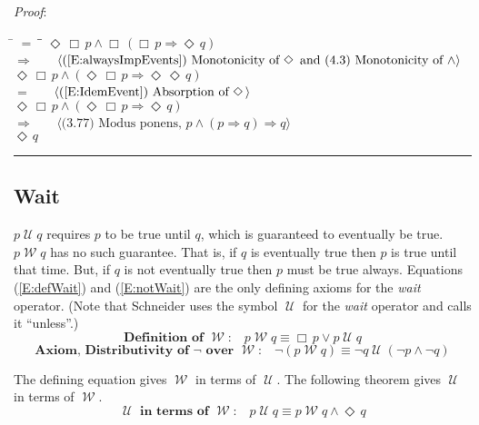 \documentclass[12pt, fleqn, leqno]{article}
\newcommand{\lgap}{2pt}                             %
\newcommand{\mymathindent}{24pt}                    %
\newcommand{\impl}{\ensuremath{\Rightarrow}}        %
\newcommand{\Until}{\;\mathcal{U}\;}
\newcommand{\Wait}{\;\mathcal{W}\;}
\newcommand{\Event}{\Diamond\,}
\newcommand{\Always}{\Box\,}
\newcommand{\myqed}{\rule[-.23ex]{1.2ex}{2.0ex}}
\newcommand{\myqedtab}{\hspace{384pt}}              %
\newcommand{\Gll} {\langle}                         %
\newcommand{\Ggg} {\rangle}                         %
\newcommand{\Hint}[1]     {\ \ \ $\Gll              \mbox{#1} \Ggg$ }   %
\begin{document}
\emph{Proof}:
\begin{tabbing}
\hspace{\mymathindent} \= $= \;$ \= \myqedtab \= \kill
\> \>   $\Event\Always p \land \Always(\Always p \impl \Event q)$\\[\lgap]
\> $\impl$  \>  \Hint{(\ref{E:alwaysImpEvents}) Monotonicity of $\Event$ and (4.3) Monotonicity of $\land$}\\[\lgap]
\> \>   $\Event\Always p \land (\Event\Always p \impl \Event\Event q)$\\[\lgap]
\> $=$  \>  \Hint{(\ref{E:IdemEvent}) Absorption of $\Event$}\\[\lgap]
\> \>   $\Event\Always p \land (\Event\Always p \impl \Event q)$\\[\lgap]
\> $\impl$  \>  \Hint{(3.77) Modus ponens, $p\land (p\impl q)\impl q$}\\[\lgap]
\> \>   $\Event q$ \quad \myqed
\end{tabbing}

\subsection{Wait}\label{section-wait}

$p\Until q$ requires $p$ to be true until $q$, which is guaranteed to eventually be true.
$p\Wait q$ has no such guarantee.
That is, if $q$ is eventually true then $p$ is true until that time.
But, if $q$ is not eventually true then $p$ must be true always.
Equations (\ref{E:defWait}) and (\ref{E:notWait}) are the only defining axioms for the \textit{wait} operator.
(Note that Schneider \cite{Schn} uses the symbol $\Until$ for the \textit{wait} operator and calls it ``unless''.)
\begin{equation}\label{E:defWait}
\textbf{Definition of $\Wait$:}\quad p \Wait q \equiv \Always p \lor p \Until q 
\end{equation}
\begin{equation}\label{E:notWait}
\textbf{Axiom, Distributivity of $\neg$ over $\Wait$:}\quad \neg (p \Wait q) \equiv \neg q \Until (\neg p \land \neg q)
\end{equation}

The defining equation gives $\Wait$ in terms of $\Until$. The following theorem gives $\Until$ in terms of $\Wait$.
\begin{equation}\label{E:untilFromWait}
\textbf{$\Until$ in terms of $\Wait$:}\quad p \Until q \equiv p \Wait q\land \Event q
\end{equation}
\end{document}
